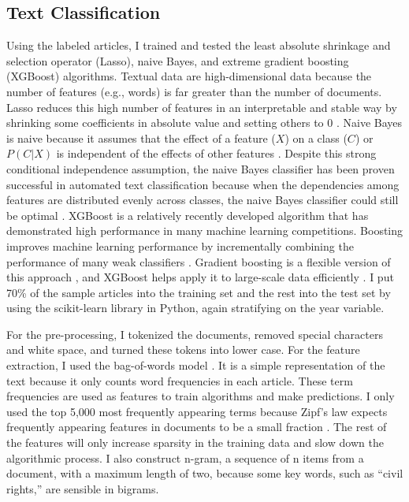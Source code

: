 \documentclass[12 pt]{article}
\begin{document}
\subsection{Text Classification}
Using the labeled articles, I trained and tested the least absolute shrinkage and selection operator (Lasso), naive Bayes, and extreme gradient boosting (XGBoost) algorithms. Textual data are high-dimensional data because the number of features (e.g., words) is far greater than the number of documents. Lasso reduces this high number of features in an interpretable and stable way by shrinking some coefficients in absolute value and setting others to 0 \citep[267-273]{tibshirani1996regression}. Naive Bayes is naive because it assumes that the effect of a feature ($X$) on a class ($C$) or $P(C|X)$ is independent of the effects of other features \citep[410]{maron1961automatic}. Despite this strong conditional independence assumption, the naive Bayes classifier has been proven successful in automated text classification \citep[11-12]{maron1961automatic} because when the dependencies among features are distributed evenly across classes, the naive Bayes classifier could still be optimal \citep{zhang2005exploring}. XGBoost is a relatively recently developed algorithm that has demonstrated high performance in many machine learning competitions. Boosting improves machine learning performance by incrementally combining the performance of many weak classifiers \citep{freund1999short, friedman2000additive}. Gradient boosting is a flexible version of this approach \citep{breiman1997arcing, mason2000boosting, friedman2001greedy}, and XGBoost helps apply it to large-scale data efficiently \citep{chen2016xgboost}. I put 70\% of the sample articles into the training set and the rest into the test set by using the scikit-learn library in Python, again stratifying on the year variable. 

For the pre-processing, I tokenized the documents, removed special characters and white space, and turned these tokens into lower case. For the feature extraction, I used the bag-of-words model \citep{harris1954distributional}. It is a simple representation of the text because it only counts word frequencies in each article. These term frequencies are used as features to train algorithms and make predictions. I only used the top 5,000 most frequently appearing terms because Zipf's law expects frequently appearing features in documents to be a small fraction \citep{zipf1936psycho, zipf1949human}. The rest of the features will only increase sparsity in the training data and slow down the algorithmic process. I also construct n-gram, a sequence of n items from a document, with a maximum length of two, because some key words, such as “civil rights,” are sensible in bigrams.
\end{document}
